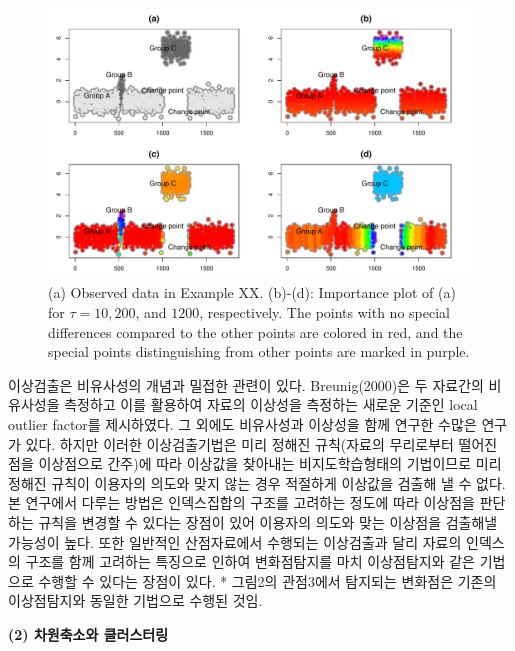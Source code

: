 \documentclass[preprint, review, 12pt]{article}
\theoremstyle{definition}
\theoremstyle{remark}
\begin{document}
\begin{figure}
\centering
\includegraphics[width=1\textwidth]{Fig/Fig3.pdf}
\caption{(a) Observed data in Example XX. (b)-(d): Importance plot of (a) for $\tau=10, 200$, and $1200$, respectively. The points with no special differences compared to the other points are colored in red, and the special points distinguishing from other points are marked in purple.}
\end{figure}

이상검출은 비유사성의 개념과 밀접한 관련이 있다. Breunig(2000)은 두 자료간의 비유사성을 측정하고 이를 활용하여 자료의 이상성을 측정하는 새로운 기준인 local outlier factor를 제시하였다. 그 외에도 비유사성과 이상성을 함께 연구한 수많은 연구가 있다. 하지만 이러한 이상검출기법은 미리 정해진 규칙(자료의 무리로부터 떨어진 점을 이상점으로 간주)에 따라 이상값을 찾아내는 비지도학습형태의 기법이므로 미리 정해진 규칙이 이용자의 의도와 맞지 않는 경우 적절하게 이상값을 검출해 낼 수 없다. 본 연구에서 다루는 방법은 인덱스집합의 구조를 고려하는 정도에 따라 이상점을 판단하는 규칙을 변경할 수 있다는 장점이 있어 이용자의 의도와 맞는 이상점을 검출해낼 가능성이 높다. 또한 일반적인 산점자료에서 수행되는 이상검출과 달리 자료의 인덱스의 구조를 함께 고려하는 특징으로 인하여 변화점탐지를 마치 이상점탐지와 같은 기법으로 수행할 수 있다는 장점이 있다.  
* 그림2의 관점3에서 탐지되는 변화점은 기존의 이상점탐지와 동일한 기법으로 수행된 것임.

\noindent\textbf{(2) 차원축소와 클러스터링}
\end{document}
